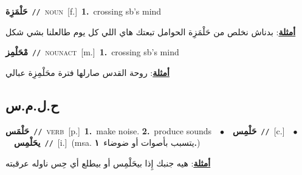 \documentclass[10pt,a4paper,twoside]{article} %
\begin{document}
\begin{multicols}{2}
{\setlength\topsep{0pt}\textbf{\foreignlanguage{arabic}{حَلْمَزِة}}\ {\color{gray}\texttt{//}\color{black}}\ \textsc{noun}\ [f.]\ \textbf{1.}~crossing sb's mind\  \begin{flushright}\color{gray}\foreignlanguage{arabic}{\textbf{\underline{\foreignlanguage{arabic}{أمثلة}}}: بدناش نخلص من حَلْمَزِة الحوامل تبعتك هاي اللي كل يوم طالعلنا بشي شكل}\end{flushright}\color{black}} \vspace{2mm}

{\setlength\topsep{0pt}\textbf{\foreignlanguage{arabic}{مْحَلْمِز}}\ {\color{gray}\texttt{//}\color{black}}\ \textsc{noun\textunderscore act}\ [m.]\ \textbf{1.}~crossing sb's mind\  \begin{flushright}\color{gray}\foreignlanguage{arabic}{\textbf{\underline{\foreignlanguage{arabic}{أمثلة}}}: روحة القدس صارلها فترة محَلْمِزِة عبالي}\end{flushright}\color{black}} \vspace{2mm}

\vspace{-3mm}
\subsection*{\color{blue}\foreignlanguage{arabic}{ح.ل.م.س}\color{blue}{}} 

{\setlength\topsep{0pt}\textbf{\foreignlanguage{arabic}{حَلْمَس}}\ {\color{gray}\texttt{//}\color{black}}\ \textsc{verb}\ [p.]\ \textbf{1.}~make noise.  \textbf{2.}~produce sounds\ \ $\bullet$\ \ \setlength\topsep{0pt}\textbf{\foreignlanguage{arabic}{حَلْمِس}}\ {\color{gray}\texttt{//}\color{black}}\ [c.]\ \ $\bullet$\ \ \setlength\topsep{0pt}\textbf{\foreignlanguage{arabic}{يحَلْمِس}}\ {\color{gray}\texttt{//}\color{black}}\ [i.]\ \color{gray}(msa. \foreignlanguage{arabic}{يتسبب بأصوات أو ضوضاء}~\foreignlanguage{arabic}{\textbf{١.}})\color{black}\  \begin{flushright}\color{gray}\foreignlanguage{arabic}{\textbf{\underline{\foreignlanguage{arabic}{أمثلة}}}: هيه جنبك إِذا بيحَلْمِس أو بيطلع أي حِس ناوله عرقبته}\end{flushright}\color{black}} \vspace{2mm}


\end{multicols}
\end{document}

